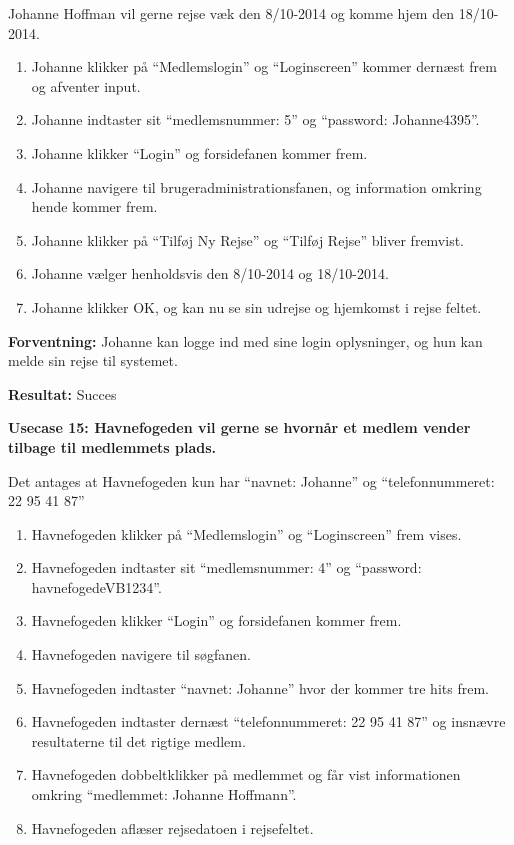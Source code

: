 Johanne Hoffman vil gerne rejse væk den 8/10-2014 og komme hjem den 18/10-2014.
\begin{enumerate}
	\item Johanne klikker på \enquote{Medlemslogin} og \enquote{Loginscreen} kommer dernæst frem og afventer input.
	\item Johanne indtaster sit \enquote{medlemsnummer: 5} og \enquote{password: Johanne4395}.
	\item Johanne klikker \enquote{Login} og forsidefanen kommer frem.
	\item Johanne navigere til brugeradministrationsfanen, og information omkring hende kommer frem.
	\item Johanne klikker på \enquote{Tilføj Ny Rejse} og \enquote{Tilføj Rejse} bliver fremvist.
	\item Johanne vælger henholdsvis den 8/10-2014 og 18/10-2014.
	\item Johanne klikker OK, og kan nu se sin udrejse og hjemkomst i rejse feltet.
\end{enumerate}

\textbf{Forventning:} Johanne kan logge ind med sine login oplysninger, og hun kan melde sin rejse til systemet.

\textbf{Resultat:} Succes


\textbf{Usecase 15: Havnefogeden vil gerne se hvornår et medlem vender tilbage til medlemmets plads.}

Det antages at Havnefogeden kun har \enquote{navnet: Johanne} og \enquote{telefonnummeret: 22 95 41 87}
\begin{enumerate}
	\item Havnefogeden klikker på \enquote{Medlemslogin} og \enquote{Loginscreen} frem vises.
	\item Havnefogeden indtaster sit \enquote{medlemsnummer: 4} og \enquote{password: havnefogedeVB1234}.
	\item Havnefogeden klikker \enquote{Login} og forsidefanen kommer frem.
	\item Havnefogeden navigere til søgfanen.
	\item Havnefogeden indtaster \enquote{navnet: Johanne} hvor der kommer tre hits frem.
	\item Havnefogeden indtaster dernæst \enquote{telefonnummeret: 22 95 41 87} og insnævre resultaterne til det rigtige medlem.
	\item Havnefogeden dobbeltklikker på medlemmet og får vist informationen omkring \enquote{medlemmet: Johanne Hoffmann}.
	\item Havnefogeden aflæser rejsedatoen i rejsefeltet.
\end{enumerate} 

